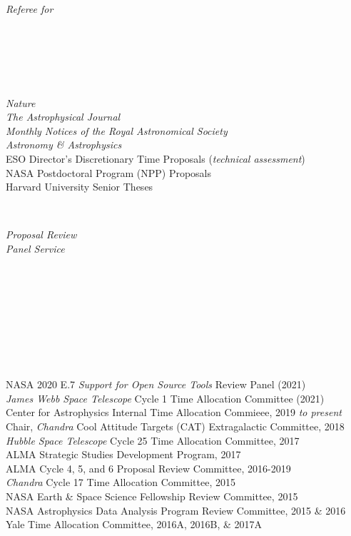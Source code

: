 \documentclass[11pt]{article}
\begin{document}
\vspace{4mm}


\hspace{2.5mm} \parbox{1.5in}{\textit{Referee for \\\\\\\\\\\\}} \parbox{5.15in}{
\textit{Nature}\\
\textit{The Astrophysical Journal}\\
\textit{Monthly Notices of the Royal Astronomical Society}\\
\textit{Astronomy \& Astrophysics}\\
ESO Director's Discretionary Time Proposals (\textit{technical assessment}) \\
NASA Postdoctoral Program (NPP) Proposals \\
Harvard University Senior Theses} \\

\vspace{4mm}


\hspace{2.5mm} \parbox{1.5in}{\textit{Proposal Review \\ Panel Service \\\\\\\\\\\\\\\\\\}} \parbox{5.15in}{NASA 2020 E.7 \textit{Support for Open Source Tools} Review Panel (2021)\\
\textit{James Webb Space Telescope} Cycle 1 Time Allocation Committee (2021)\\
Center for Astrophysics Internal Time Allocation Commieee, 2019 \textit{to present} \\
Chair, \textit{Chandra} Cool Attitude Targets (CAT) Extragalactic Committee, 2018\\
\textit{Hubble Space Telescope} Cycle 25 Time Allocation Committee, 2017 \\
ALMA Strategic Studies Development Program, 2017 \\
ALMA Cycle 4, 5, and 6 Proposal Review Committee, 2016-2019 \\\textit{Chandra} Cycle 17 Time Allocation Committee, 2015  \\ NASA Earth \& Space Science Fellowship Review Committee, 2015 \\
NASA Astrophysics Data Analysis Program Review Committee, 2015 \& 2016 \\
Yale Time Allocation Committee, 2016A, 2016B, \& 2017A} \\
\end{document}
